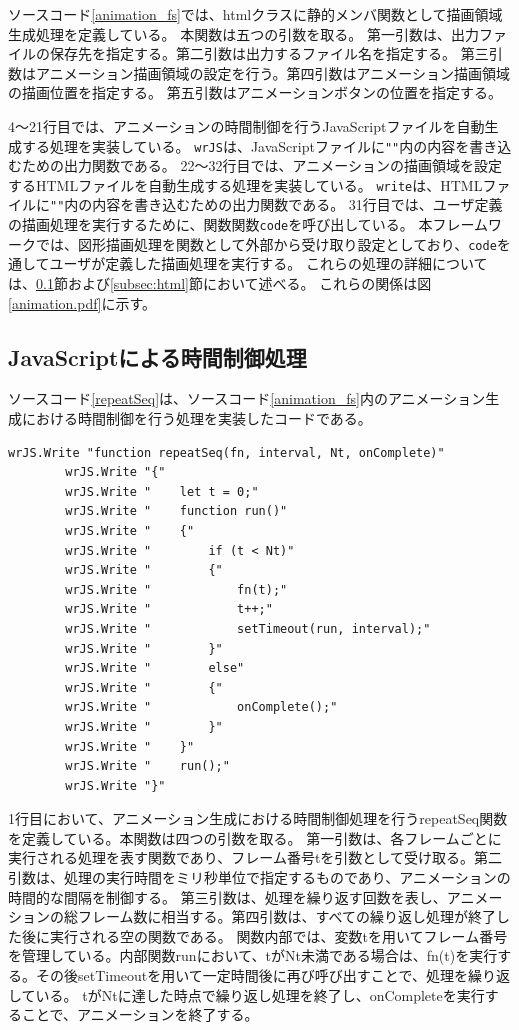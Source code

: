 ソースコード\ref{animation_fs}では、htmlクラスに静的メンバ関数として描画領域生成処理を定義している。
本関数は五つの引数を取る。
第一引数は、出力ファイルの保存先を指定する。第二引数は出力するファイル名を指定する。
第三引数はアニメーション描画領域の設定を行う。第四引数はアニメーション描画領域の描画位置を指定する。
第五引数はアニメーションボタンの位置を指定する。
\par
4～21行目では、アニメーションの時間制御を行うJavaScriptファイルを自動生成する処理を実装している。
\texttt{wrJS}は、JavaScriptファイルに\texttt{""}内の内容を書き込むための出力関数である。
22～32行目では、アニメーションの描画領域を設定するHTMLファイルを自動生成する処理を実装している。
\texttt{write}は、HTMLファイルに\texttt{""}内の内容を書き込むための出力関数である。
31行目では、ユーザ定義の描画処理を実行するために、関数関数\texttt{code}を呼び出している。
本フレームワークでは、図形描画処理を関数として外部から受け取り設定としており、\texttt{code}を通してユーザが定義した描画処理を実行する。
これらの処理の詳細については、\ref{subsec:javascript}節および\ref{subsec:html}節において述べる。
これらの関係は図\ref{animation.pdf}に示す。

\subsection{JavaScriptによる時間制御処理}\label{subsec:javascript}
 ソースコード\ref{repeatSeq}は、ソースコード\ref{animation_fs}内のアニメーション生成における時間制御を行う処理を実装したコードである。
 \begin{lstlisting}[caption={時間制御処理（fsファイル）},label={repeatSeq},breaklines=true,breakatwhitespace=false]
        wrJS.Write "function repeatSeq(fn, interval, Nt, onComplete)"
        wrJS.Write "{"
        wrJS.Write "    let t = 0;"
        wrJS.Write "    function run()"
        wrJS.Write "    {"
        wrJS.Write "        if (t < Nt)"
        wrJS.Write "        {"
        wrJS.Write "            fn(t);"
        wrJS.Write "            t++;"
        wrJS.Write "            setTimeout(run, interval);"
        wrJS.Write "        }"
        wrJS.Write "        else"
        wrJS.Write "        {"
        wrJS.Write "            onComplete();"
        wrJS.Write "        }"
        wrJS.Write "    }"
        wrJS.Write "    run();"
        wrJS.Write "}"
\end{lstlisting}
1行目において、アニメーション生成における時間制御処理を行うrepeatSeq関数を定義している。本関数は四つの引数を取る。
第一引数は、各フレームごとに実行される処理を表す関数であり、フレーム番号tを引数として受け取る。第二引数は、処理の実行時間をミリ秒単位で指定するものであり、アニメーションの時間的な間隔を制御する。
第三引数は、処理を繰り返す回数を表し、アニメーションの総フレーム数に相当する。第四引数は、すべての繰り返し処理が終了した後に実行される空の関数である。
関数内部では、変数tを用いてフレーム番号を管理している。内部関数runにおいて、tがNt未満である場合は、fn(t)を実行する。その後setTimeoutを用いて一定時間後に再び呼び出すことで、処理を繰り返している。
tがNtに達した時点で繰り返し処理を終了し、onCompleteを実行することで、アニメーションを終了する。

